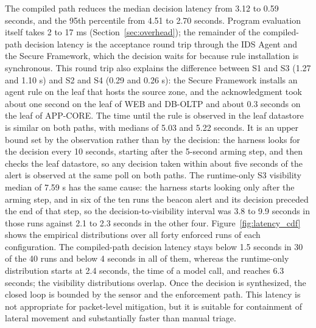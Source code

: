 \documentclass[final,5p]{elsarticle}
\begin{document}
The compiled path reduces the median decision latency from 3.12 to 0.59 seconds, and the 95th percentile from 4.51 to 2.70 seconds. Program evaluation itself takes 2 to 17 ms (Section~\ref{sec:overhead}); the remainder of the compiled-path decision latency is the acceptance round trip through the IDS Agent and the Secure Framework, which the decision waits for because rule installation is synchronous. This round trip also explains the difference between S1 and S3 (1.27 and 1.10 s) and S2 and S4 (0.29 and 0.26 s): the Secure Framework installs an agent rule on the leaf that hosts the source zone, and the acknowledgment took about one second on the leaf of WEB and DB-OLTP and about 0.3 seconds on the leaf of APP-CORE. The time until the rule is observed in the leaf datastore is similar on both paths, with medians of 5.03 and 5.22 seconds. It is an upper bound set by the observation rather than by the decision: the harness looks for the decision every 10 seconds, starting after the 5-second arming step, and then checks the leaf datastore, so any decision taken within about five seconds of the alert is observed at the same poll on both paths. The runtime-only S3 visibility median of 7.59 s has the same cause: the harness starts looking only after the arming step, and in six of the ten runs the beacon alert and its decision preceded the end of that step, so the decision-to-visibility interval was 3.8 to 9.9 seconds in those runs against 2.1 to 2.3 seconds in the other four. Figure~\ref{fig:latency_cdf} shows the empirical distributions over all forty enforced runs of each configuration. The compiled-path decision latency stays below 1.5 seconds in 30 of the 40 runs and below 4 seconds in all of them, whereas the runtime-only distribution starts at 2.4 seconds, the time of a model call, and reaches 6.3 seconds; the visibility distributions overlap. Once the decision is synthesized, the closed loop is bounded by the sensor and the enforcement path. This latency is not appropriate for packet-level mitigation, but it is suitable for containment of lateral movement and substantially faster than manual triage.
\end{document}
